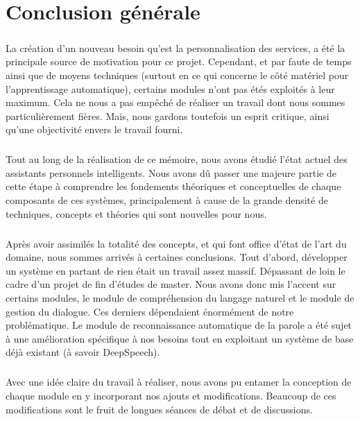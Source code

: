 \chapter*{Conclusion générale}

\paragraph{}
La création d'un nouveau besoin qu'est la personnalisation des services, a été la principale source de motivation pour ce projet. Cependant, et par faute de temps ainsi que de moyens techniques (surtout en ce qui concerne le côté matériel pour l'apprentissage automatique), certains modules n'ont pas étés exploités à leur maximum. Cela ne nous a pas empêché de réaliser un travail dont nous sommes particulièrement fières. Mais, nous gardons toutefois un esprit critique, ainsi qu'une objectivité envers le travail fourni. 

\paragraph{}
Tout au long de la réalisation de ce mémoire, nous avons étudié l'état actuel des assistants personnels intelligents. Nous avons dû passer une majeure partie de cette étape à comprendre les fondements théoriques et conceptuelles de chaque composants de ces systèmes, principalement à cause de la grande densité de techniques, concepts et théories qui sont nouvelles pour nous.

\paragraph{}
Après avoir assimilés la totalité des concepts, et qui font office d'état de l'art du domaine, nous sommes arrivés à certaines conclusions. Tout d'abord, développer un système en partant de rien était un travail assez massif. Dépassant de loin le cadre d'un projet de fin d'études de master. Nous avons donc mis l'accent sur certains modules, le module de compréhension du langage naturel et le module de gestion du dialogue. Ces derniers dépendaient énormément de notre problématique. Le module de reconnaissance automatique de la parole a été sujet à une amélioration spécifique à nos besoins tout en exploitant un système de base déjà existant (à savoir DeepSpeech).


\paragraph{}
Avec une idée claire du travail à réaliser, nous avons pu entamer la conception de chaque module en y incorporant nos ajouts et modifications. Beaucoup de ces modifications sont le fruit de longues séances de débat et de discussions. 

